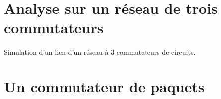     \section{Analyse sur un réseau de trois commutateurs}
%
        \paragraph{}
Simulation d'un lien d'un réseau à 3 commutateurs de circuits.

    \clearpage
%
    \clearpage
%
%
%
    \section{Un commutateur de paquets}
%
    \clearpage
%
    \clearpage
%
    \clearpage
%

